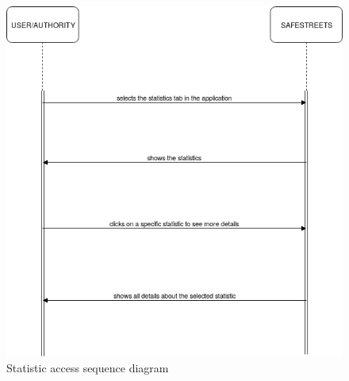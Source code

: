 \documentclass {article}
\begin{document}
		\begin{figure}[H]
			\centering
			\includegraphics[scale=0.55]{Images/Diagrams/68SeqDiagram.png}
			\caption{Statistic access sequence diagram}
		\end{figure}
	
\end{document}
